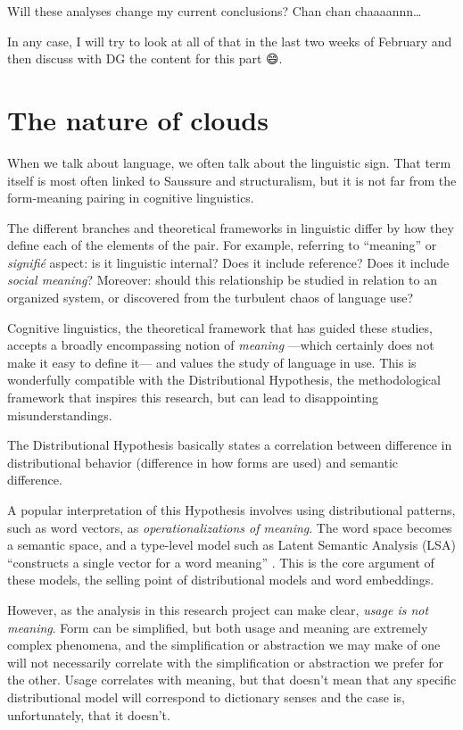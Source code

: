 \documentclass[
]{book}
\begin{document}
Will these analyses change my current conclusions? Chan chan chaaaannn\ldots{}

In any case, I will try to look at all of that in the last two weeks of February and then
discuss with DG the content for this part 😄.

\hypertarget{the-nature-of-clouds}{%
\chapter{The nature of clouds}\label{the-nature-of-clouds}}

When we talk about language, we often talk about the linguistic sign. That term itself
is most often linked to Saussure
and structuralism, but it is not far from the form-meaning pairing in cognitive linguistics.

The different branches and theoretical frameworks in linguistic differ by how they
define each of the elements of the pair. For example, referring to ``meaning'' or \emph{signifié}
aspect: is it linguistic internal? Does it include reference? Does it include \emph{social meaning}?
Moreover: should this relationship be studied in relation to an organized system,
or discovered from the turbulent chaos of language use?

Cognitive linguistics, the theoretical framework that has guided these studies, accepts
a broadly encompassing notion of \emph{meaning} ---which certainly does not make it easy to
define it--- and values the study of language in use. This is wonderfully compatible with
the Distributional Hypothesis, the methodological framework that inspires this research,
but can lead to disappointing misunderstandings.

The Distributional Hypothesis basically states a correlation between difference in
distributional behavior (difference in how forms are used) and semantic difference.

A popular interpretation of this Hypothesis involves using distributional patterns,
such as word vectors, as \emph{operationalizations of meaning}. The word space becomes a
semantic space, and a type-level model such as Latent Semantic Analysis (LSA)
``constructs a single vector for a word meaning'' \autocite[ 82]{bolognesi_2020}. This is the core
argument of these models, the selling point of distributional models and word embeddings.

However, as the analysis in this research project can make clear, \emph{usage is not meaning}.
Form can be simplified, but both usage and meaning are extremely complex phenomena,
and the simplification or abstraction we may make of one will not necessarily correlate
with the simplification or abstraction we prefer for the other. Usage correlates with
meaning, but that doesn't mean that any specific distributional model will correspond
to dictionary senses and the case is, unfortunately, that it doesn't.
\end{document}
